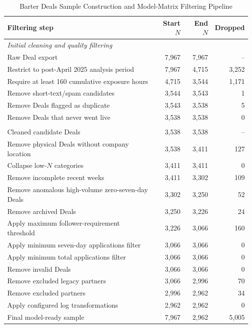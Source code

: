 \begin{table}[htbp]
\centering
\caption{Barter Deals Sample Construction and Model-Matrix Filtering Pipeline}
\label{tab:barter_sample_construction}
\begin{tabular}{lrrr}
\toprule
Filtering step & Start $N$ & End $N$ & Dropped \\
\midrule
\multicolumn{4}{l}{\textit{Initial cleaning and quality filtering}} \\
Raw Deal export & 7{,}967 & 7{,}967 & -- \\
Restrict to post-April 2025 analysis period & 7{,}967 & 4{,}715 & 3{,}252 \\
Require at least 160 cumulative exposure hours & 4{,}715 & 3{,}544 & 1{,}171 \\
Remove short-text/spam candidates & 3{,}544 & 3{,}543 & 1 \\
Remove Deals flagged as duplicate & 3{,}543 & 3{,}538 & 5 \\
Remove Deals that never went live & 3{,}538 & 3{,}538 & 0 \\
\addlinespace[0.35em]

\multicolumn{4}{l}{\textit{Model-matrix preparation}} \\
Cleaned candidate Deals & 3{,}538 & 3{,}538 & -- \\
Remove physical Deals without company location & 3{,}538 & 3{,}411 & 127 \\
Collapse low-$N$ categories & 3{,}411 & 3{,}411 & 0 \\
Remove incomplete recent weeks & 3{,}411 & 3{,}302 & 109 \\
Remove anomalous high-volume zero-seven-day Deals & 3{,}302 & 3{,}250 & 52 \\
Remove archived Deals & 3{,}250 & 3{,}226 & 24 \\
Apply maximum follower-requirement threshold & 3{,}226 & 3{,}066 & 160 \\
Apply minimum seven-day applications filter & 3{,}066 & 3{,}066 & 0 \\
Apply minimum total applications filter & 3{,}066 & 3{,}066 & 0 \\
Remove invalid Deals & 3{,}066 & 3{,}066 & 0 \\
Remove excluded legacy partners & 3{,}066 & 2{,}996 & 70 \\
Remove excluded partners & 2{,}996 & 2{,}962 & 34 \\
Apply configured log transformations & 2{,}962 & 2{,}962 & 0 \\
\midrule
Final model-ready sample & 7{,}967 & 2{,}962 & 5{,}005 \\
\bottomrule
\end{tabular}


\end{table}
